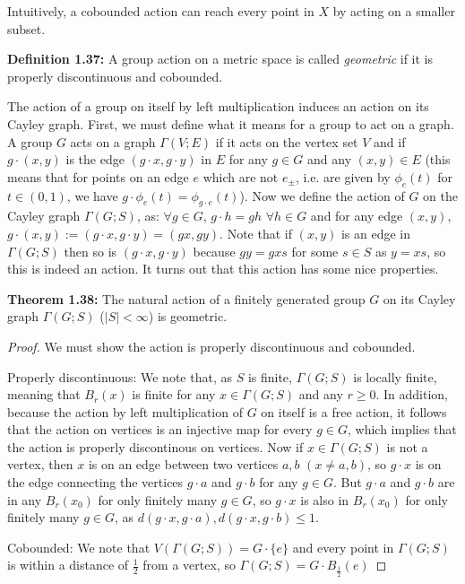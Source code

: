 \documentclass[12pt]{article}
\newcommand{\vs}{\vskip10pt}
\begin{document}
	\vskip5pt
	
	Intuitively, a cobounded action can reach every point in $X$ by acting on a smaller subset. 
	
	\vs 
	
	\textbf{Definition 1.37: } A group action on a metric space is called \textit{geometric} if it is properly discontinuous and cobounded.
	
	\vs 
	
	The action of a group on itself by left multiplication induces an action on its Cayley graph. First, we must define what it means for a group to act on a graph. A group $G$ acts on a graph $\Gamma(V;E)$ if it acts on the vertex set $V$ and if $g \cdot (x,y)$ is the edge $(g\cdot x, g \cdot y)$ in $E$ for any $g \in G$ and any $(x,y) \in E$ (this means that for points on an edge $e$ which are not $e_{\pm}$, i.e. are given by $\phi_e(t)$ for $t \in (0,1)$, we have $g \cdot \phi_e(t) = \phi_{g \cdot e} (t)$). Now we define the action of $G$ on the Cayley graph $\Gamma(G;S)$, as: $\forall g \in G$, $g \cdot h = gh$ $\forall h \in G$ and for any edge $(x,y)$, $g \cdot (x,y) := (g \cdot x, g \cdot y) = (gx, gy)$. Note that if $(x,y)$ is an edge in $\Gamma(G;S)$ then so is $(g \cdot x, g \cdot y)$ because $gy = gxs$ for some $s \in S$ as $y = xs$, so this is indeed an action. It turns out that this action has some nice properties. 
	
	\vs 
	
	\textbf{Theorem 1.38: } The natural action of a finitely generated group $G$ on its Cayley graph $\Gamma(G;S)$ ($\vert S \vert < \infty$) is geometric. 
	
	\begin{proof}
		
		We must show the action is properly discontinuous and cobounded. 
		
		\vs 
		
		Properly discontinuous: We note that, as $S$ is finite, $\Gamma(G;S)$ is locally finite, meaning that $B_r(x)$ is finite for any $x \in \Gamma(G;S)$ and any $r\geq 0$. In addition, because the action by left multiplication of $G$ on itself is a free action, it follows that the action on vertices is an injective map for every $g \in G$, which implies that the action is properly discontinous on vertices. Now if $x \in \Gamma(G;S)$ is not a vertex, then $x$ is on an edge between two vertices $a,b$ $(x \neq a,b)$, so $g \cdot x$ is on the edge connecting the vertices $g \cdot a$ and $g \cdot b$ for any $g \in G$. But $g \cdot a$ and $g \cdot b$ are in any $B_r(x_0)$ for only finitely many $g \in G$, so $g \cdot x$ is also in $B_r(x_0)$ for only finitely many $g \in G$, as $d(g \cdot x, g \cdot a), d(g \cdot x, g \cdot b) \leq 1$.
		
		\vs 
		
		Cobounded: We note that $V(\Gamma(G;S)) = G \cdot \{e\}$ and every point in $\Gamma(G;S)$ is within a distance of $\frac{1}{2}$ from a vertex, so $\Gamma(G;S) = G \cdot B_{\frac{1}{2}}(e)$
		
	\end{proof}
	
\end{document}
